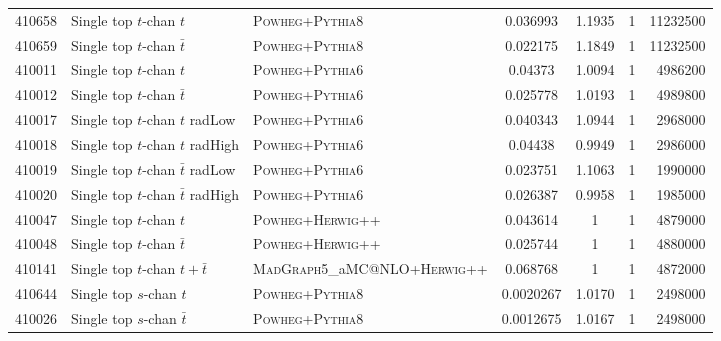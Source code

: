 \begin{table}[hb]
{\begin{tabular}{rllS[table-format=10.9]S[table-format=10.9]rr}
      410658 & Single top $t$-chan $t$ & \textsc{Powheg}+\textsc{Pythia}8 & 0.036993 & 1.1935 & 1 & 11232500 \\
      410659 & Single top $t$-chan $\bar{t}$ & \textsc{Powheg}+\textsc{Pythia}8 & 0.022175 & 1.1849 & 1 & 11232500 \\
      
      410011 & Single top $t$-chan $t$ & \textsc{Powheg}+\textsc{Pythia}6 & 0.04373 & 1.0094 & 1 & 4986200 \\
      410012 & Single top $t$-chan $\bar{t}$ & \textsc{Powheg}+\textsc{Pythia}6 & 0.025778 & 1.0193 & 1 & 4989800 \\
      410017 & Single top $t$-chan $t$ radLow & \textsc{Powheg}+\textsc{Pythia}6 & 0.040343 & 1.0944 & 1 & 2968000\\
      410018 & Single top $t$-chan $t$ radHigh & \textsc{Powheg}+\textsc{Pythia}6 & 0.04438 & 0.9949 & 1 & 2986000\\
      410019 & Single top $t$-chan $\bar{t}$ radLow & \textsc{Powheg}+\textsc{Pythia}6 & 0.023751 & 1.1063 & 1 & 1990000\\
      410020 & Single top $t$-chan $\bar{t}$ radHigh & \textsc{Powheg}+\textsc{Pythia}6 & 0.026387 & 0.9958 & 1 & 1985000\\
      410047 & Single top $t$-chan $t$ & \textsc{Powheg}+\textsc{Herwig}++ & 0.043614  & 1 & 1 & 4879000\\
      410048 & Single top $t$-chan $\bar{t}$ & \textsc{Powheg}+\textsc{Herwig}++ &  0.025744 & 1 & 1 & 4880000 \\
      410141 & Single top $t$-chan $t+\bar{t}$ & \textsc{MadGraph}5\_aMC@NLO+\textsc{Herwig}++ &  0.068768  & 1 & 1 & 4872000 \\
      
      410644 & Single top $s$-chan $t$ & \textsc{Powheg}+\textsc{Pythia}8 & 0.0020267 & 1.0170 & 1 &  2498000\\
      410026 & Single top $s$-chan $\bar{t}$ & \textsc{Powheg}+\textsc{Pythia}8 & 0.0012675 & 1.0167 & 1 &  2498000\\
      

\end{tabular}}
\end{table}
